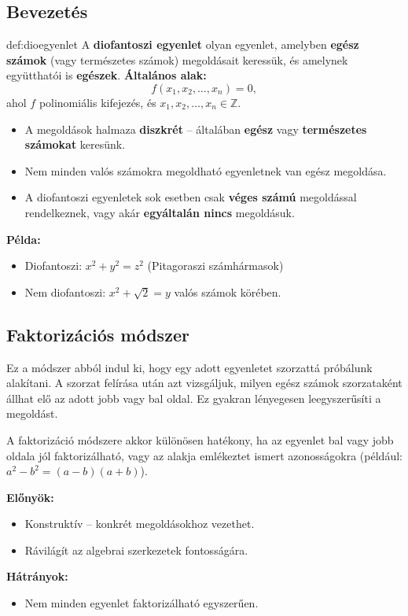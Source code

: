 

\subsection*{Bevezetés}

\begin{definition}{def:dioegyenlet}
	A \textbf{diofantoszi egyenlet} olyan egyenlet,
	amelyben \textbf{egész számok} (vagy természetes számok) megoldásait
	keressük, és amelynek együtthatói is \textbf{egészek}.
	\vspace{0.3cm}
	\textbf{Általános alak:} 
	\[
	f(x_{1},x_{2},\ldots,x_{n})=0,
	\]
	ahol $f$ polinomiális kifejezés, és $x_{1},x_{2},\ldots,x_{n}\in\mathbb{Z}$.
\end{definition}
\begin{itemize}
	\item A megoldások halmaza \textbf{diszkrét} -- általában \textbf{egész}
	vagy \textbf{természetes számokat} keresünk. 
	\item Nem minden valós számokra megoldható egyenletnek van egész megoldása. 
	\item A diofantoszi egyenletek sok esetben csak \textbf{véges számú} megoldással
	rendelkeznek, vagy akár \textbf{egyáltalán nincs} megoldásuk. 
\end{itemize}
\textbf{Példa:} 
\begin{itemize}
	\item Diofantoszi: $x^{2}+y^{2}=z^{2}$ (Pitagoraszi számhármasok) 
	\item Nem diofantoszi: $x^{2}+\sqrt{2}=y$ valós számok körében. 
\end{itemize}

\subsection*{Faktorizációs módszer}

Ez a módszer abból indul ki, hogy egy adott egyenletet szorzattá próbálunk
alakítani. A szorzat felírása után azt vizsgáljuk, milyen egész számok
szorzataként állhat elő az adott jobb vagy bal oldal. Ez gyakran lényegesen
leegyszerűsíti a megoldást.

A faktorizáció módszere akkor különösen hatékony, ha az egyenlet bal
vagy jobb oldala jól faktorizálható, vagy az alakja emlékeztet ismert
azonosságokra (például: $a^{2}-b^{2}=(a-b)(a+b)$).

\noindent\textbf{Előnyök:} 
\begin{itemize}
	\item Konstruktív -- konkrét megoldásokhoz vezethet. 
	\item Rávilágít az algebrai szerkezetek fontosságára. 
\end{itemize}
\textbf{Hátrányok:} 
\begin{itemize}
	\item Nem minden egyenlet faktorizálható egyszerűen. 
\end{itemize}

